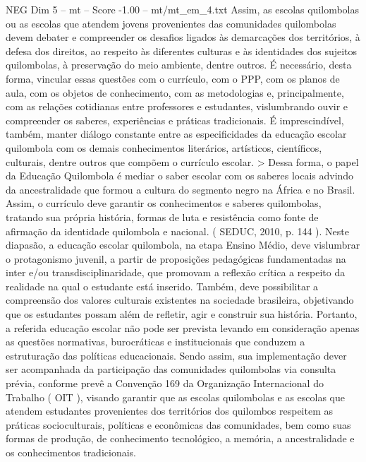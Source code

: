 \begin{textsample}{NEG Dim 5 – mt – Score -1.00 – mt/mt\_em\_4.txt}
Assim, as escolas quilombolas ou as escolas que atendem jovens provenientes das comunidades quilombolas devem debater e compreender os desafios ligados às demarcações dos territórios, à defesa dos direitos, ao respeito às diferentes culturas e às identidades dos sujeitos quilombolas, à preservação do meio ambiente, dentre outros.
É necessário, desta forma, vincular essas questões com o currículo, com o PPP, com os planos de aula, com os objetos de conhecimento, com as metodologias e, principalmente, com as relações cotidianas entre professores e estudantes, vislumbrando ouvir e compreender os saberes, experiências e práticas tradicionais.
É imprescindível, também, manter diálogo constante entre as especificidades da educação escolar quilombola com os demais conhecimentos literários, artísticos, científicos, culturais, dentre outros que compõem o currículo escolar. > Dessa forma, o papel da Educação Quilombola é mediar o saber escolar com os saberes locais advindo da ancestralidade que formou a cultura do segmento negro na África e no Brasil.
Assim, o currículo deve garantir os conhecimentos e saberes quilombolas, tratando sua própria história, formas de luta e resistência como fonte de afirmação da identidade quilombola e nacional. ( SEDUC, 2010, p. 144 ).
Neste diapasão, a educação escolar quilombola, na etapa Ensino Médio, deve vislumbrar o protagonismo juvenil, a partir de proposições pedagógicas fundamentadas na inter e/ou transdisciplinaridade, que promovam a reflexão crítica a respeito da realidade na qual o estudante está inserido.
Também, deve possibilitar a compreensão dos valores culturais existentes na sociedade brasileira, objetivando que os estudantes possam além de refletir, agir e construir sua história.
Portanto, a referida educação escolar não pode ser prevista levando em consideração apenas as questões normativas, burocráticas e institucionais que conduzem a estruturação das políticas educacionais.
Sendo assim, sua implementação dever ser acompanhada da participação das comunidades quilombolas via consulta prévia, conforme prevê a Convenção 169 da Organização Internacional do Trabalho ( OIT ), visando garantir que as escolas quilombolas e as escolas que atendem estudantes provenientes dos territórios dos quilombos respeitem as práticas socioculturais, políticas e econômicas das comunidades, bem como suas formas de produção, de conhecimento tecnológico, a memória, a ancestralidade e os conhecimentos tradicionais.

\end{textsample}
